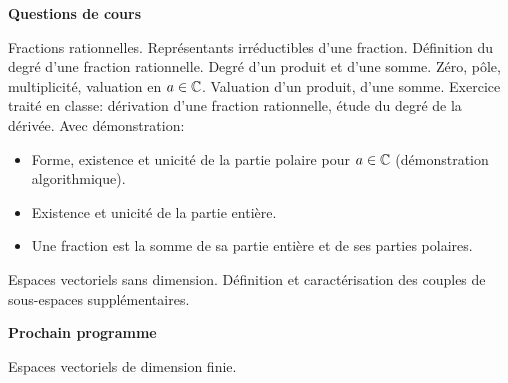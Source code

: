 

\bigskip
\begin{center}
 \textbf{Questions de cours}
\end{center}

Fractions rationnelles.\newline
Représentants irréductibles d'une fraction.\newline
Définition du degré d'une fraction rationnelle. Degré d'un produit et d'une somme.\newline
Zéro, pôle, multiplicité, valuation en $a\in \mathbb{C}$. Valuation d'un produit, d'une somme.\newline
Exercice traité en classe: dérivation d'une fraction rationnelle, étude du degré de la dérivée.\newline
Avec démonstration:
\begin{itemize}
 \item Forme, existence et unicité de la partie polaire pour $a\in \mathbb{C}$ (démonstration algorithmique).
 \item Existence et unicité de la partie entière.
 \item Une fraction est la somme de sa partie entière et de ses parties polaires.
\end{itemize}

Espaces vectoriels sans dimension.\newline
Définition et caractérisation des couples de sous-espaces supplémentaires.

\begin{center}
 \textbf{Prochain programme}
\end{center}
Espaces vectoriels de dimension finie.

